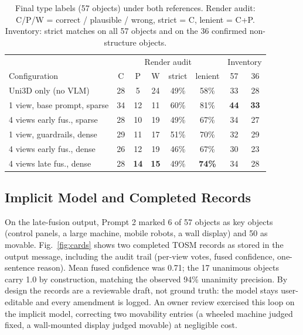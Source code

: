 \documentclass[conference]{IEEEtran}
\begin{document}
\begin{table}[t]
\caption{Final type labels (57 objects) under both references. Render
audit: C/P/W = correct / plausible / wrong, strict = C, lenient = C+P.
Inventory: strict matches on all 57 objects and on the 36 confirmed
non-structure objects.}
\label{tab:configs}
\centering
\footnotesize
\setlength{\tabcolsep}{3.5pt}
\begin{tabular}{@{}lccccc|cc@{}}
\toprule
 & \multicolumn{5}{c|}{Render audit} & \multicolumn{2}{c}{Inventory} \\
Configuration & C & P & W & strict & lenient & 57 & 36 \\
\midrule
Uni3D only (no VLM)            & 28 & 5  & 24 & 49\% & 58\% & 33 & 28 \\
1 view, base prompt, sparse    & 34 & 12 & 11 & 60\% & 81\% & \textbf{44} & \textbf{33} \\
4 views early fus., sparse     & 28 & 10 & 19 & 49\% & 67\% & 34 & 27 \\
1 view, guardrails, dense      & 29 & 11 & 17 & 51\% & 70\% & 32 & 29 \\
4 views early fus., dense      & 26 & 12 & 19 & 46\% & 67\% & 30 & 23 \\
4 views late fus., dense & 28 & \textbf{14} & \textbf{15}
  & 49\% & \textbf{74\%} & 34 & 28 \\
\bottomrule
\end{tabular}
\end{table}




\subsection{Implicit Model and Completed Records}
On the late-fusion output, Prompt 2 marked 6 of 57 objects as key objects
(control panels, a large machine, mobile robots, a wall display) and 50 as
movable. Fig.~\ref{fig:cards} shows two completed TOSM records as stored in
the output message, including the audit trail (per-view votes, fused
confidence, one-sentence reason). Mean fused confidence was 0.71; the 17
unanimous objects carry 1.0 by construction, matching the observed 94\%
unanimity precision. By design the records are a reviewable draft, not
ground truth: the model stays user-editable and every amendment is logged.
An owner review exercised this loop on the implicit model, correcting two
movability entries (a wheeled machine judged fixed, a wall-mounted display
judged movable) at negligible cost.
\end{document}

